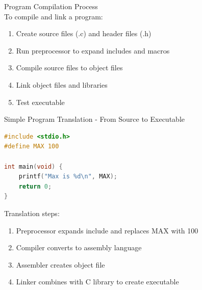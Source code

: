 \begin{KR}{Program Compilation Process}\\
To compile and link a program:
\begin{enumerate}
  \item Create source files (.c) and header files (.h)
  \item Run preprocessor to expand includes and macros
  \item Compile source files to object files
  \item Link object files and libraries
  \item Test executable
\end{enumerate}
\end{KR}

\begin{code}{Simple Program Translation - From Source to Executable}
\begin{lstlisting}[language=C, style=base]
#include <stdio.h>
#define MAX 100

int main(void) {
    printf("Max is %d\n", MAX);
    return 0;
}
\end{lstlisting}

Translation steps:
\begin{enumerate}
  \item Preprocessor expands include and replaces MAX with 100
  \item Compiler converts to assembly language
  \item Assembler creates object file
  \item Linker combines with C library to create executable
\end{enumerate}
\end{code}